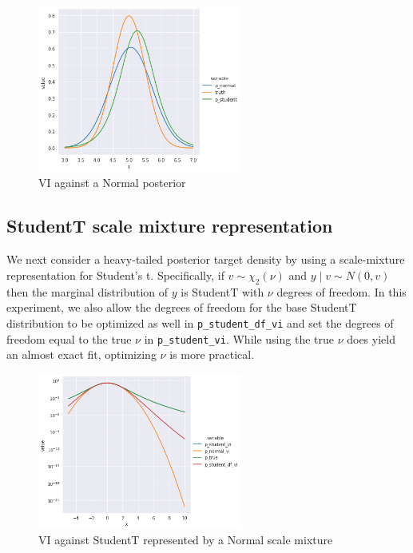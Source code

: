 \documentclass{scrartcl}
\theoremstyle{definition}
\begin{document}
\begin{figure}[H]
    \centering
    \includegraphics[width=0.6\textwidth]{Figures/normal_normal_posterior.png}
    \caption{VI against a Normal posterior}
    \label{fig:normal_normal}
\end{figure}

\subsection{StudentT scale mixture representation}

We next consider a heavy-tailed posterior target density by using a scale-mixture
representation for Student's t. Specifically, if $v \sim \chi_2(\nu)$
and $y \mid v \sim N(0, v)$ then the marginal distribution of $y$ is StudentT
with $\nu$ degrees of freedom.
In this experiment, we also allow the degrees of freedom for the base StudentT
distribution to be optimized as well in \texttt{p\_student\_df\_vi} and set
the degrees of freedom equal to the true $\nu$ in \texttt{p\_student\_vi}.
While using the true $\nu$ does yield an almost exact fit, optimizing $\nu$ is
more practical.

\begin{figure}[H]
    \centering
    \includegraphics[width=0.6\textwidth]{Figures/studentt_log_scale.png}
    \caption{VI against StudentT represented by a Normal scale mixture}
    \label{fig:studentt_loc_scale}
\end{figure}
\end{document}
